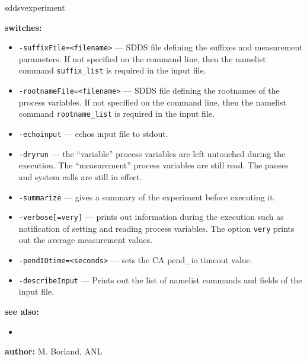 \begin{sddsprog}{sddsvexperiment}
\item \textbf{switches:}
\begin{itemize}
  \item {\verb+-suffixFile=<filename>+} --- SDDS file defining the suffixes and measurement parameters. If not specified
               on the command line, then the namelist command {\verb+suffix_list+} is required in the input file.
  \item {\verb+-rootnameFile=<filename>+} --- SDDS file defining the rootnames of the process variables. If not specified
               on the command line, then the namelist command {\verb+rootname_list+} is required in the input file.
  \item {\verb+-echoinput+} --- echos input file to stdout.
  \item {\verb+-dryrun+} --- the ``variable'' process variables are left untouched during the execution. The ``measurement''
                process variables are still read. The pauses and system calls are still in effect.
  \item {\verb+-summarize+} --- gives a summary of the experiment before executing it.
  \item {\verb+-verbose[=very]+} --- prints out information during the execution such as notification of
                setting and reading process variables.  The option \verb+very+ prints out the average measurement values.
  \item {\verb+-pendIOtime=<seconds>+} --- sets the CA pend\_io timeout value.
  \item {\verb+-describeInput+} --- Prints out the list of namelist commands and fields of the input file.
\end{itemize}

\item \textbf{see also:}
\begin{itemize}
  \item {}
\end{itemize}
\item \textbf{author:} M. Borland, ANL
\end{sddsprog}
